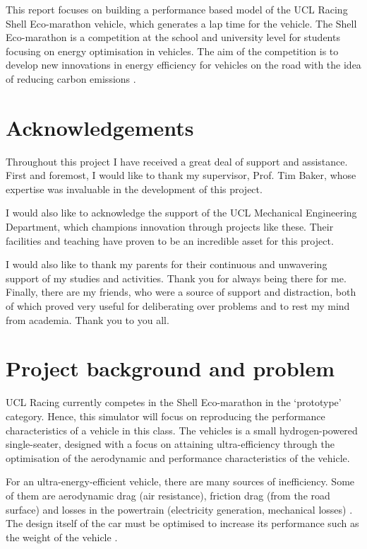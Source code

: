 \documentclass[11pt]{article}
\numberwithin{equation}{section}
\begin{document}
This report focuses on building a performance based model of the UCL Racing Shell Eco-marathon vehicle, which generates a lap time for the vehicle. The Shell Eco-marathon is a competition at the school and university level for students focusing on energy optimisation in vehicles. The aim of the competition is to develop new innovations in energy efficiency for vehicles on the road with the idea of reducing carbon emissions \citep{shell1}.
\section*{Acknowledgements}
Throughout this project I have received a great deal of support and assistance. First and foremost, I would like to thank my supervisor, Prof. Tim Baker, whose expertise was invaluable in the development of this project. 

I would also like to acknowledge the support of the UCL Mechanical Engineering Department, which champions innovation through projects like these. Their facilities and teaching have proven to be an incredible asset for this project. 

I would also like to thank my parents for their continuous and unwavering support of my studies and activities. Thank you for always being there for me. Finally, there are my friends, who were a source of support and distraction, both of which proved very useful for deliberating over problems and to rest my mind from academia. Thank you to you all.
\newpage
\tableofcontents
\listoffigures
\listoftables
\newpage
\section{Project background and problem}
UCL Racing currently competes in the Shell Eco-marathon in the `prototype' category. Hence, this simulator will focus on reproducing the performance characteristics of a vehicle in this class. The vehicles is a small hydrogen-powered single-seater, designed with a focus on attaining ultra-efficiency through the optimisation of the aerodynamic and performance characteristics of the vehicle.

For an ultra-energy-efficient vehicle, there are many sources of inefficiency. Some of them are aerodynamic drag (air resistance), friction drag (from the road surface) and losses in the powertrain (electricity generation, mechanical losses) \citep{Wei2019}. The design itself of the car must be optimised to increase its performance such as the weight of the vehicle \citep{Tsirogiannis2019}.
\end{document}
